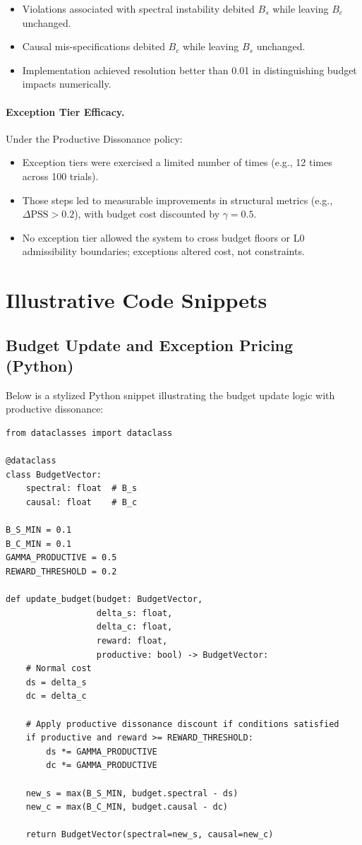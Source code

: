 \documentclass[11pt]{article}
\begin{document}
\begin{itemize}[itemsep=2pt]
  \item Violations associated with spectral instability debited \(B_s\) while leaving \(B_c\) unchanged.
  \item Causal mis-specifications debited \(B_c\) while leaving \(B_s\) unchanged.
  \item Implementation achieved resolution better than 0.01 in distinguishing budget impacts numerically.
\end{itemize}

\paragraph{Exception Tier Efficacy.}
Under the Productive Dissonance policy:

\begin{itemize}[itemsep=2pt]
  \item Exception tiers were exercised a limited number of times (e.g., 12 times across 100 trials).
  \item Those steps led to measurable improvements in structural metrics (e.g., \(\Delta \text{PSS} > 0.2\)), with budget cost discounted by \(\gamma = 0.5\).
  \item No exception tier allowed the system to cross budget floors or L0 admissibility boundaries; exceptions altered cost, not constraints.
\end{itemize}

\section{Illustrative Code Snippets}

\subsection{Budget Update and Exception Pricing (Python)}

Below is a stylized Python snippet illustrating the budget update logic with productive dissonance:

\begin{verbatim}
from dataclasses import dataclass

@dataclass
class BudgetVector:
    spectral: float  # B_s
    causal: float    # B_c

B_S_MIN = 0.1
B_C_MIN = 0.1
GAMMA_PRODUCTIVE = 0.5
REWARD_THRESHOLD = 0.2

def update_budget(budget: BudgetVector,
                  delta_s: float,
                  delta_c: float,
                  reward: float,
                  productive: bool) -> BudgetVector:
    # Normal cost
    ds = delta_s
    dc = delta_c

    # Apply productive dissonance discount if conditions satisfied
    if productive and reward >= REWARD_THRESHOLD:
        ds *= GAMMA_PRODUCTIVE
        dc *= GAMMA_PRODUCTIVE

    new_s = max(B_S_MIN, budget.spectral - ds)
    new_c = max(B_C_MIN, budget.causal - dc)

    return BudgetVector(spectral=new_s, causal=new_c)
\end{verbatim}
\end{document}
